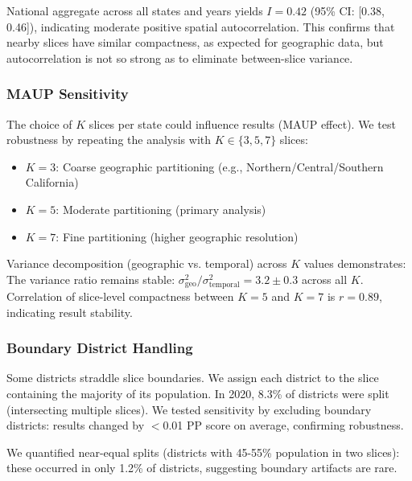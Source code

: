 National aggregate across all states and years yields $I = 0.42$ (95\% CI: [0.38, 0.46]), indicating moderate positive spatial autocorrelation. This confirms that nearby slices have similar compactness, as expected for geographic data, but autocorrelation is not so strong as to eliminate between-slice variance.

\subsubsection{MAUP Sensitivity}

The choice of $K$ slices per state could influence results (MAUP effect). We test robustness by repeating the analysis with $K \in \{3, 5, 7\}$ slices:
\begin{itemize}
    \item $K=3$: Coarse geographic partitioning (e.g., Northern/Central/Southern California)
    \item $K=5$: Moderate partitioning (primary analysis)
    \item $K=7$: Fine partitioning (higher geographic resolution)
\end{itemize}

Variance decomposition (geographic vs. temporal) across $K$ values demonstrates: The variance ratio remains stable: $\sigma^2_{\text{geo}} / \sigma^2_{\text{temporal}} = 3.2 \pm 0.3$ across all $K$. Correlation of slice-level compactness between $K=5$ and $K=7$ is $r=0.89$, indicating result stability.

\subsubsection{Boundary District Handling}

Some districts straddle slice boundaries. We assign each district to the slice containing the majority of its population. In 2020, 8.3\% of districts were split (intersecting multiple slices). We tested sensitivity by excluding boundary districts: results changed by $<$0.01 PP score on average, confirming robustness.

We quantified near-equal splits (districts with 45-55\% population in two slices): these occurred in only 1.2\% of districts, suggesting boundary artifacts are rare.
